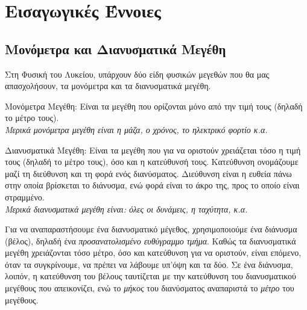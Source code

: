 \chapter{Εισαγωγικές Έννοιες}
\clearpage
%
%
%
%
%
%
\section{Μονόμετρα και Διανυσματικά Μεγέθη}

Στη Φυσική του Λυκείου, υπάρχουν δύο είδη φυσικών μεγεθών που θα μας απασχολήσουν, τα μονόμετρα και τα διανυσματικά μεγέθη.

\begin{orismos}{Μονόμετρα Μεγέθη:}
Είναι τα μεγέθη που ορίζονται μόνο από την τιμή τους (δηλαδή το μέτρο τους).\\
\textit{Μερικά μονόμετρα μεγέθη είναι η μάζα, ο χρόνος, το ηλεκτρικό φορτίο κ.α.}
\end{orismos}
\vspace{4mm}
\begin{orismos}{Διανυσματικά Μεγέθη:}
Είναι τα μεγέθη που για να οριστούν χρειάζεται τόσο η τιμή τους (δηλαδή το μέτρο τους), όσο και η κατεύθυνσή τους.
\tcblower
Κατεύθυνση ονομάζουμε μαζί τη διεύθυνση και τη φορά ενός διανύσματος. Διεύθυνση είναι η ευθεία πάνω στην οποία βρίσκεται το διάνυσμα, ενώ φορά είναι το άκρο της, προς το οποίο είναι στραμμένο.\\
\textit{Μερικά διανυσματικά μεγέθη είναι: όλες οι δυνάμεις, η ταχύτητα, κ.α.}
\end{orismos}

\vspace{2mm}
Για να αναπαραστήσουμε ένα διανυσματικό μέγεθος, χρησιμοποιούμε ένα διάνυσμα (βέλος), δηλαδή ένα \textit{προσανατολισμένο ευθύγραμμο τμήμα}. Καθώς τα διανυσματικά μεγέθη χρειάζονται τόσο μέτρο, όσο και κατεύθυνση για να οριστούν, είναι επόμενο, όταν τα συγκρίνουμε, να πρέπει να λάβουμε υπ'όψη και τα δύο. Σε ένα διάνυσμα, λοιπόν, η κατεύθυνση του βέλους ταυτίζεται με την κατεύθυνση του διανυσματικού μεγέθους που απεικονίζει, ενώ το \textit{μήκος} του διανύσματος αναπαριστά το \textit{μέτρο} του μεγέθους.
\vspace{2mm}

